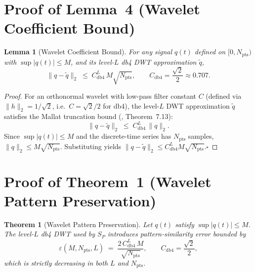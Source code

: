 \documentclass[10pt,twocolumn,a4paper]{article}
\newtheorem{theorem}{Theorem}
\newtheorem{lemma}{Lemma}
\newcommand{\SPER}{S_{P}}
\newcommand{\Npts}{N_{\mathrm{pts}}}
\newcommand{\Cdb}{C_{\mathrm{db4}}}
\begin{document}
\section{Proof of Lemma~4 (Wavelet Coefficient Bound)}

\begin{lemma}[Wavelet Coefficient Bound]
For any signal $q(t)$ defined on $[0,\Npts)$ with $\sup|q(t)|\leq M$,
and its level-$L$ db4 DWT approximation $\tilde{q}$,
\[
  \|q-\tilde{q}\|_{2}\;\leq\;\Cdb^{L}\,M\sqrt{\Npts},
  \qquad \Cdb=\frac{\sqrt{2}}{2}\approx 0.707.
\]
\end{lemma}

\begin{proof}
For an orthonormal wavelet with low-pass filter constant $C$ (defined
via $\|h\|_{2}=1/\sqrt{2}$, i.e.\ $C=\sqrt{2}/2$ for db4), the
level-$L$ DWT approximation $\tilde{q}$ satisfies the Mallat
truncation bound (\cite{Mallat1989Wavelets}, Theorem~7.13):
\[
  \|q-\tilde{q}\|_{2}\;\leq\;\Cdb^{L}\,\|q\|_{2}.
\]
Since $\sup|q(t)|\leq M$ and the discrete-time series has $\Npts$
samples, $\|q\|_{2}\leq M\sqrt{\Npts}$. Substituting yields
$\|q-\tilde{q}\|_{2}\leq\Cdb^{L}M\sqrt{\Npts}$.\hfill$\square$
\end{proof}

\section{Proof of Theorem~1 (Wavelet Pattern Preservation)}

\begin{theorem}[Wavelet Pattern Preservation]
Let $q(t)$ satisfy $\sup|q(t)|\leq M$. The level-$L$ db4 DWT used by
$\SPER$ introduces pattern-similarity error bounded by
\[
  \varepsilon(M,\Npts,L)\;=\;\frac{2\,\Cdb^{L}\,M}{\sqrt{\Npts}},
  \qquad \Cdb=\frac{\sqrt{2}}{2},
\]
which is strictly decreasing in both $L$ and $\Npts$.
\end{theorem}
\end{document}
